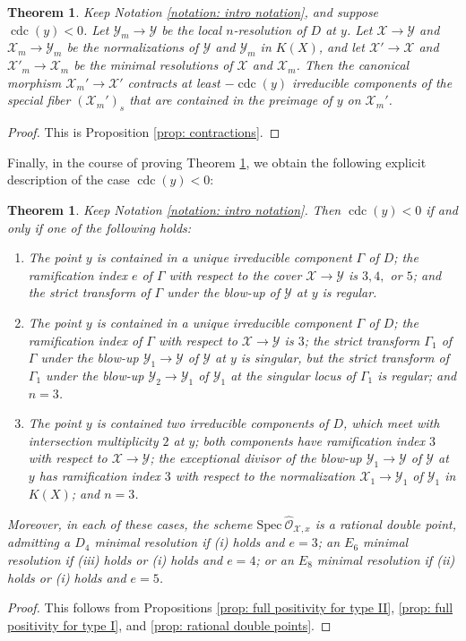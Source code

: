 \documentclass[12pt]{amsart}
\numberwithin{equation}{section}
\newtheorem{theorem}[equation]{Theorem}
\theoremstyle{definition}
\renewcommand{\O}{\mathcal{O}}
\newcommand{\Spec}{\mathrm{Spec} \ }
\newcommand{\X}{\mathcal{X}}
\newcommand{\Y}{\mathcal{Y}}
\DeclareMathOperator{\cdc}{cdc}
\begin{document}
\begin{theorem}\label{thm: contractions}
    Keep Notation \ref{notation: intro notation}, and suppose $\cdc(y)<0$. Let $\Y_m\to\Y$ be the local $n$-resolution of $D$ at $y$. Let $\X\to\Y$ and $\X_m\to\Y_m$ be the normalizations of $\Y$ and $\Y_m$ in $K(X)$, and let $\X'\to\X$ and $\X'_m\to\X_m$ be the minimal resolutions of $\X$ and $\X_m$.
    Then the canonical morphism $\X_m'\to\X'$ contracts at least $-\cdc(y)$ irreducible components of the special fiber $(\X_m')_s$ that are contained in the preimage of $y$ on $\X_m'$.
\end{theorem}
\begin{proof}
    This is Proposition \ref{prop: contractions}.
\end{proof}

Finally, in the course of proving Theorem \ref{thm: contractions}, we obtain the following explicit description of the case $\cdc(y)<0$:

\begin{theorem}\label{thm: cdc}
    Keep Notation \ref{notation: intro notation}. Then $\cdc(y)<0$ if and only if one of the following holds:
    \begin{enumerate}[\upshape (i)]
        \item The point $y$ is contained in a unique irreducible component $\Gamma$ of $D$; the ramification index $e$ of $\Gamma$ with respect to the cover $\X\to\Y$ is $3,4,$ or $5$; and the strict transform of $\Gamma$ under the blow-up of $\Y$ at $y$ is regular.
        \item The point $y$ is contained in a unique irreducible component $\Gamma$ of $D$; the ramification index of $\Gamma$ with respect to $\X\to\Y$ is $3$; the strict transform $\Gamma_1$ of $\Gamma$ under the blow-up $\Y_1\to\Y$ of $\Y$ at $y$ is singular, but the strict transform of $\Gamma_1$ under the blow-up $\Y_2\to\Y_1$ of $\Y_1$ at the singular locus of $\Gamma_1$ is regular; and $n=3$.
        \item The point $y$ is contained two irreducible components of $D$, which meet with intersection multiplicity $2$ at $y$; both components have ramification index $3$ with respect to $\X\to\Y$; the exceptional divisor of the blow-up $\Y_1\to\Y$ of $\Y$ at $y$ has ramification index $3$ with respect to the normalization $\X_1\to\Y_1$ of $\Y_1$ in $K(X)$; and $n=3$.
    \end{enumerate}
    Moreover, in each of these cases, the scheme $\Spec\widehat{\O}_{\X,x}$ is a rational double point, admitting a $D_4$ minimal resolution if \textup{(i)} holds and $e=3$; an $E_6$ minimal resolution if \textup{(iii)} holds or \textup{(i)} holds and $e=4$; or an $E_8$ minimal resolution if \textup{(ii)} holds or \textup{(i)} holds and $e=5$.
\end{theorem}
\begin{proof}
    This follows from Propositions \ref{prop: full positivity for type II}, \ref{prop: full positivity for type I}, and \ref{prop: rational double points}.
\end{proof}
    
\end{document}
